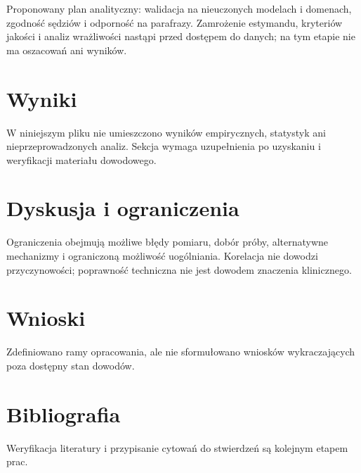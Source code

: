 \documentclass[11pt,a4paper]{article}
\begin{document}
Proponowany plan analityczny: walidacja na nieuczonych modelach i domenach, zgodność sędziów i odporność na parafrazy. Zamrożenie estymandu, kryteriów jakości i analiz wrażliwości nastąpi przed dostępem do danych; na tym etapie nie ma oszacowań ani wyników.

\section{Wyniki}

W niniejszym pliku nie umieszczono wyników empirycznych, statystyk ani nieprzeprowadzonych analiz. Sekcja wymaga uzupełnienia po uzyskaniu i weryfikacji materiału dowodowego.

\section{Dyskusja i ograniczenia}

Ograniczenia obejmują możliwe błędy pomiaru, dobór próby, alternatywne mechanizmy i ograniczoną możliwość uogólniania. Korelacja nie dowodzi przyczynowości; poprawność techniczna nie jest dowodem znaczenia klinicznego.

\section{Wnioski}

Zdefiniowano ramy opracowania, ale nie sformułowano wniosków wykraczających poza dostępny stan dowodów.

\section*{Bibliografia}

Weryfikacja literatury i przypisanie cytowań do stwierdzeń są kolejnym etapem prac.
\end{document}
